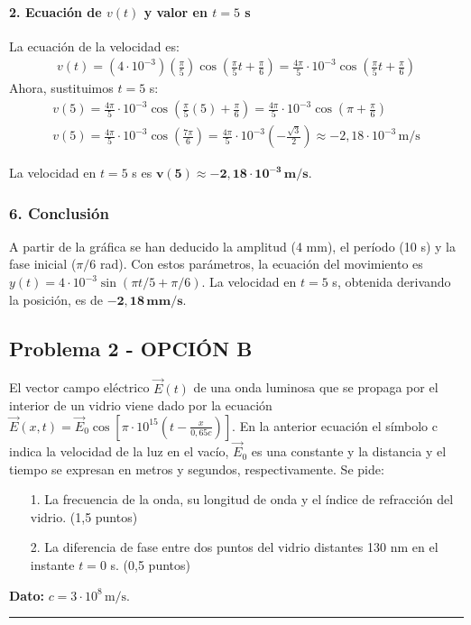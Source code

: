 \paragraph*{2. Ecuación de $v(t)$ y valor en $t=5$ s}
La ecuación de la velocidad es:
\begin{gather}
    v(t) = (4 \cdot 10^{-3}) \left(\frac{\pi}{5}\right) \cos\left(\frac{\pi}{5}t + \frac{\pi}{6}\right) = \frac{4\pi}{5} \cdot 10^{-3} \cos\left(\frac{\pi}{5}t + \frac{\pi}{6}\right)
\end{gather}
Ahora, sustituimos $t=5$ s:
\begin{gather}
    v(5) = \frac{4\pi}{5} \cdot 10^{-3} \cos\left(\frac{\pi}{5}(5) + \frac{\pi}{6}\right) = \frac{4\pi}{5} \cdot 10^{-3} \cos\left(\pi + \frac{\pi}{6}\right) \nonumber \\[8pt]
    v(5) = \frac{4\pi}{5} \cdot 10^{-3} \cos\left(\frac{7\pi}{6}\right) = \frac{4\pi}{5} \cdot 10^{-3} \left(-\frac{\sqrt{3}}{2}\right) \approx -2,18 \cdot 10^{-3} \, \text{m/s}
\end{gather}
\begin{cajaresultado}
    La velocidad en $t=5$ s es $\boldsymbol{v(5) \approx -2,18 \cdot 10^{-3} \, \textbf{m/s}}$.
\end{cajaresultado}

\subsubsection*{6. Conclusión}
\begin{cajaconclusion}
    A partir de la gráfica se han deducido la amplitud (4 mm), el período (10 s) y la fase inicial ($\pi/6$ rad). Con estos parámetros, la ecuación del movimiento es $y(t) = 4 \cdot 10^{-3} \sin(\pi t/5 + \pi/6)$. La velocidad en $t=5$ s, obtenida derivando la posición, es de $\mathbf{-2,18 \, mm/s}$.
\end{cajaconclusion}

\newpage

\subsection{Problema 2 - OPCIÓN B}
\label{subsec:2B_2005_jun_cv}

\begin{cajaenunciado}
El vector campo eléctrico $\vec{E}(t)$ de una onda luminosa que se propaga por el interior de un vidrio viene dado por la ecuación $\vec{E}(x,t) = \vec{E}_0 \cos[\pi \cdot 10^{15}(t - \frac{x}{0,65c})]$. En la anterior ecuación el símbolo c indica la velocidad de la luz en el vacío, $\vec{E}_0$ es una constante y la distancia y el tiempo se expresan en metros y segundos, respectivamente. Se pide:
\begin{enumerate}
    \item[1.] La frecuencia de la onda, su longitud de onda y el índice de refracción del vidrio. (1,5 puntos)
    \item[2.] La diferencia de fase entre dos puntos del vidrio distantes 130 nm en el instante $t=0$ s. (0,5 puntos)
\end{enumerate}
\textbf{Dato:} $c=3\cdot10^8\,\text{m/s}$.
\end{cajaenunciado}
\hrule

